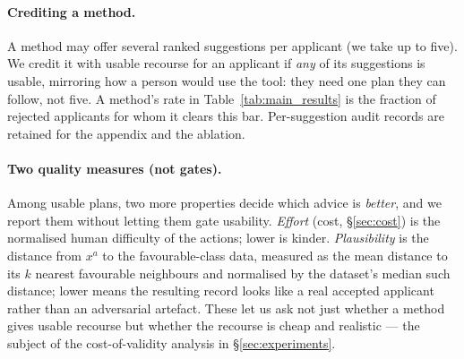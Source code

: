 \paragraph{Crediting a method.} A method may offer several ranked suggestions per
applicant (we take up to five). We credit it with usable recourse for an applicant
if \emph{any} of its suggestions is usable, mirroring how a person would use the
tool: they need one plan they can follow, not five. A method's \Usable{} rate in
Table~\ref{tab:main_results} is the fraction of rejected applicants for whom it
clears this bar. Per-suggestion audit records are retained for the appendix and
the ablation.

\paragraph{Two quality measures (not gates).} Among usable plans, two more
properties decide which advice is \emph{better}, and we report them without
letting them gate usability.
\emph{Effort} (cost, \S\ref{sec:cost}) is the normalised human difficulty of the
actions; lower is kinder.
\emph{Plausibility} is the distance from $x^{a}$ to the favourable-class data,
measured as the mean distance to its $k$ nearest favourable neighbours and
normalised by the dataset's median such distance; lower means the resulting record
looks like a real accepted applicant rather than an adversarial artefact. These
let us ask not just whether a method gives usable recourse but whether the recourse
is cheap and realistic --- the subject of the cost-of-validity analysis in
\S\ref{sec:experiments}.
